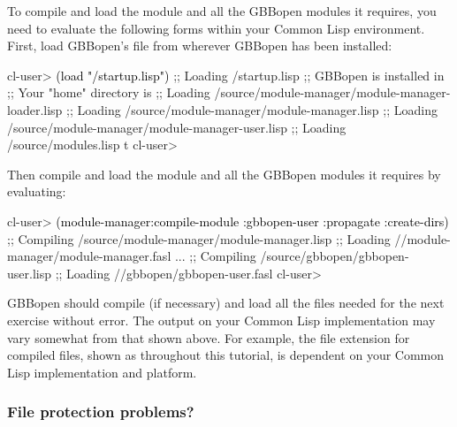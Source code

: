 \documentclass[10pt,twoside,english,pdftex]{article}
\begin{document}
To compile and load the  module and all the GBBopen
modules it requires, you need to evaluate the following forms within your
Common Lisp environment.  First, load GBBopen's
 file from wherever GBBopen
has been installed:
%
\W\supp
\begin{example}
\textcolor{darkergray}{%
  cl-user> \textcolor{black}{(load "/startup.lisp")}
  ;; Loading /startup.lisp
  ;; GBBopen is installed in 
  ;; Your "home" directory is 
  ;;  Loading /source/module-manager/module-manager-loader.lisp
  ;;   Loading /source/module-manager/module-manager.lisp
  ;;     Loading /source/module-manager/module-manager-user.lisp
  ;;  Loading /source/modules.lisp
  t
  cl-user>}
\end{example}
%
%
Then compile and load the  module and all the
GBBopen modules it requires by evaluating:
%
\W\supp\notpretop
\begin{example}
\textcolor{darkergray}{%
  cl-user> \textcolor{black}{(module-manager:compile-module :gbbopen-user :propagate :create-dirs)}
  ;; Compiling /source/module-manager/module-manager.lisp
  ;; Loading //module-manager/module-manager.fasl
       ...
  ;; Compiling /source/gbbopen/gbbopen-user.lisp
  ;; Loading //gbbopen/gbbopen-user.fasl
  cl-user>}
\end{example}

GBBopen should compile (if necessary) and load all the files needed for the
next exercise without error.  The output on your Common Lisp implementation
may vary somewhat from that shown above.  For example, the file extension for
compiled files, shown as  throughout this tutorial, is dependent on
your Common Lisp implementation and platform.

\subsubsection*{File protection problems?}
\end{document}
